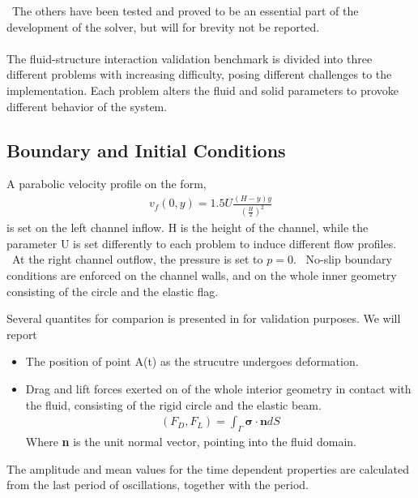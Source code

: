 \ 
The others have been tested and proved to be an essential part of the development of the solver, but will for brevity not be reported. \\ \\

The fluid-structure interaction validation benchmark is divided into three different problems with increasing difficulty, posing different challenges to the implementation.
Each problem alters the fluid and solid parameters to provoke different behavior of the system.

\subsection{Boundary and Initial Conditions}
A parabolic velocity profile on the form,
\begin{align*}
v_f(0, y) = 1.5 U\frac{(H -y)y}{(\frac{H}{2})^2} 
\end{align*}
is set on the left channel inflow. H is the height of the channel, while the parameter U is set differently to each problem to induce different flow profiles. \
At the right channel outflow, the pressure is set to $p = 0$. \
No-slip boundary conditions are enforced on the channel walls, and on the whole inner geometry consisting of the circle and the elastic flag. 

Several quantites for comparion is presented in \cite{Hron2006} for validation purposes. We will report
\begin{itemize}
\item The position of point A(t) as the strucutre undergoes deformation.
\item Drag and lift forces exerted on of the whole interior geometry in contact with the fluid, consisting of the rigid circle and the elastic beam.
\begin{align*}
(F_D, F_L) = \int_{\Gamma} \mathbf{\sigma} \cdot \mathbf{n} dS
\end{align*}
Where \textbf{n} is the unit normal vector, pointing into the fluid domain.
\end{itemize}
The amplitude and mean values for the time dependent properties are calculated from the last period of oscillations, together with the period.


